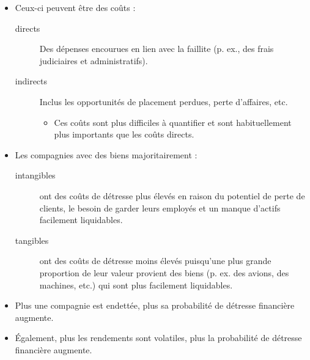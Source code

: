 \documentclass[10pt, french]{article}
\begin{document}
\begin{multicols*}{2}
\begin{definitionNOHFILLpropos}
\begin{itemize}
	\item	Ceux-ci peuvent être des coûts :
		\begin{description}
		\item[directs]	Des dépenses encourues en lien avec la faillite (p. ex., des frais judiciaires et administratifs).
		\item[indirects]	Inclus les opportunités de placement perdues, perte d'affaires, etc.
			\begin{itemize}
			\item	Ces coûts sont plus difficiles à quantifier et sont habituellement plus importants que les coûts directs.
			\end{itemize}
		\end{description}
	\item	Les compagnies avec des biens majoritairement : 
		\begin{description}
		\item[intangibles]	ont des coûts de détresse plus élevés en raison du potentiel de perte de clients, le besoin de garder leurs employés et un manque d'actifs facilement liquidables.
		\item[tangibles]	ont des coûts de détresse moins élevés puisqu'une plus grande proportion de leur valeur provient des biens (p. ex. des avions, des machines, etc.) qui sont plus facilement liquidables.	
	\end{description}
\end{itemize}
\end{definitionNOHFILLpropos}

\begin{definitionNOHFILLpropos}
\begin{itemize}
	\item	Plus une compagnie est endettée, plus sa probabilité de détresse financière augmente.
	\item	Également, plus les rendements sont volatiles, plus la probabilité de détresse financière augmente.
\end{itemize}
\end{definitionNOHFILLpropos}


\end{multicols*}
\end{document}
